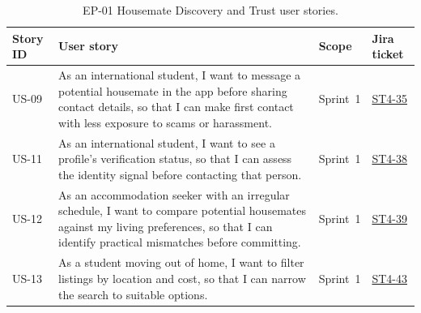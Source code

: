\documentclass[11pt,a4paper]{article}
\begin{document}
\begin{table}[H]
    \centering
    \small
    \caption{EP-01 Housemate Discovery and Trust user stories.}
    \begin{tabularx}{\textwidth}{@{}L{1.4cm}Y L{1.8cm}L{2.2cm}@{}}
        \toprule
        Story ID & User story & Scope & Jira ticket\\
        \midrule
        US-09 & As an international student, I want to message a potential housemate in the app before sharing contact details, so that I can make first contact with less exposure to scams or harassment. & Sprint~1 & \href{https://unsw-team-desn-seng2026.atlassian.net/browse/ST4-35}{ST4-35}\\
        US-11 & As an international student, I want to see a profile's verification status, so that I can assess the identity signal before contacting that person. & Sprint~1 & \href{https://unsw-team-desn-seng2026.atlassian.net/browse/ST4-38}{ST4-38}\\
        US-12 & As an accommodation seeker with an irregular schedule, I want to compare potential housemates against my living preferences, so that I can identify practical mismatches before committing. & Sprint~1 & \href{https://unsw-team-desn-seng2026.atlassian.net/browse/ST4-39}{ST4-39}\\
        US-13 & As a student moving out of home, I want to filter listings by location and cost, so that I can narrow the search to suitable options. & Sprint~1 & \href{https://unsw-team-desn-seng2026.atlassian.net/browse/ST4-43}{ST4-43}\\
        \bottomrule
    \end{tabularx}
    \label{tabstoriesep01}
\end{table}
\end{document}
